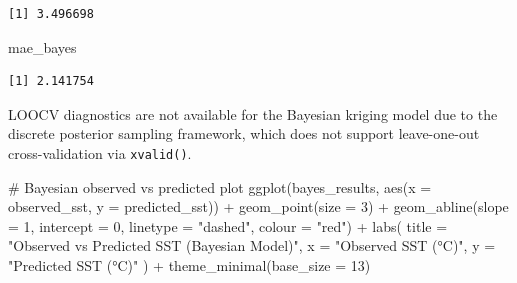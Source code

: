 \documentclass[
  11pt,
]{article}
\newenvironment{Shaded}{\begin{snugshade}}{\end{snugshade}}
\newcommand{\AttributeTok}[1]{\textcolor[rgb]{0.40,0.45,0.13}{#1}}
\newcommand{\CommentTok}[1]{\textcolor[rgb]{0.37,0.37,0.37}{#1}}
\newcommand{\DecValTok}[1]{\textcolor[rgb]{0.68,0.00,0.00}{#1}}
\newcommand{\FunctionTok}[1]{\textcolor[rgb]{0.28,0.35,0.67}{#1}}
\newcommand{\NormalTok}[1]{\textcolor[rgb]{0.00,0.23,0.31}{#1}}
\newcommand{\SpecialCharTok}[1]{\textcolor[rgb]{0.37,0.37,0.37}{#1}}
\newcommand{\StringTok}[1]{\textcolor[rgb]{0.13,0.47,0.30}{#1}}
\begin{document}
\begin{verbatim}
[1] 3.496698
\end{verbatim}

\begin{Shaded}
\begin{Highlighting}[]
\NormalTok{mae\_bayes}
\end{Highlighting}
\end{Shaded}

\begin{verbatim}
[1] 2.141754
\end{verbatim}

LOOCV diagnostics are not available for the Bayesian kriging model due
to the discrete posterior sampling framework, which does not support
leave-one-out cross-validation via \texttt{xvalid()}.

\begin{Shaded}
\begin{Highlighting}[]
\CommentTok{\# Bayesian observed vs predicted plot}
\FunctionTok{ggplot}\NormalTok{(bayes\_results, }\FunctionTok{aes}\NormalTok{(}\AttributeTok{x =}\NormalTok{ observed\_sst, }\AttributeTok{y =}\NormalTok{ predicted\_sst)) }\SpecialCharTok{+}
  \FunctionTok{geom\_point}\NormalTok{(}\AttributeTok{size =} \DecValTok{3}\NormalTok{) }\SpecialCharTok{+}
  \FunctionTok{geom\_abline}\NormalTok{(}\AttributeTok{slope =} \DecValTok{1}\NormalTok{, }\AttributeTok{intercept =} \DecValTok{0}\NormalTok{, }\AttributeTok{linetype =} \StringTok{"dashed"}\NormalTok{, }\AttributeTok{colour =} \StringTok{"red"}\NormalTok{) }\SpecialCharTok{+}
  \FunctionTok{labs}\NormalTok{(}
    \AttributeTok{title =} \StringTok{"Observed vs Predicted SST (Bayesian Model)"}\NormalTok{,}
    \AttributeTok{x =} \StringTok{"Observed SST (°C)"}\NormalTok{,}
    \AttributeTok{y =} \StringTok{"Predicted SST (°C)"}
\NormalTok{  ) }\SpecialCharTok{+}
  \FunctionTok{theme\_minimal}\NormalTok{(}\AttributeTok{base\_size =} \DecValTok{13}\NormalTok{)}
\end{Highlighting}
\end{Shaded}
\end{document}
